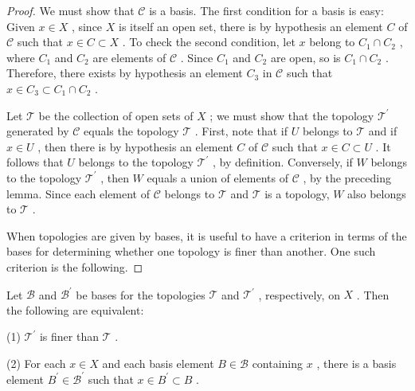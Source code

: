 \begin{proof}
We must show that \(\mathcal{C}\) is a basis. The first condition for a basis is easy: Given \(x \in  X\) , since \(X\) is itself an open set, there is by hypothesis an element \(C\) of \(\mathcal{C}\) such that \(x \in  C \subset  X\) . To check the second condition, let \(x\) belong to \({C}_{1} \cap  {C}_{2}\) , where \({C}_{1}\) and \({C}_{2}\) are elements of \(\mathcal{C}\) . Since \({C}_{1}\) and \({C}_{2}\) are open, so is \({C}_{1} \cap  {C}_{2}\) . Therefore, there exists by hypothesis an element \({C}_{3}\) in \(\mathcal{C}\) such that \(x \in  {C}_{3} \subset  {C}_{1} \cap  {C}_{2}\) .

Let \(\mathcal{T}\) be the collection of open sets of \(X\) ; we must show that the topology \({\mathcal{T}}^{\prime }\) generated by \(\mathcal{C}\) equals the topology \(\mathcal{T}\) . First, note that if \(U\) belongs to \(\mathcal{T}\) and if \(x \in  U\) , then there is by hypothesis an element \(C\) of \(\mathcal{C}\) such that \(x \in  C \subset  U\) . It follows that \(U\) belongs to the topology \({\mathcal{T}}^{\prime }\) , by definition. Conversely, if \(W\) belongs to the topology \({\mathcal{T}}^{\prime }\) , then \(W\) equals a union of elements of \(\mathcal{C}\) , by the preceding lemma. Since each element of \(\mathcal{C}\) belongs to \(\mathcal{T}\) and \(\mathcal{T}\) is a topology, \(W\) also belongs to \(\mathcal{T}\) .

When topologies are given by bases, it is useful to have a criterion in terms of the bases for determining whether one topology is finer than another. One such criterion is the following.
\end{proof}

\begin{lemma} Let \(\mathcal{B}\) and \({\mathcal{B}}^{\prime }\) be bases for the topologies \(\mathcal{T}\) and \({\mathcal{T}}^{\prime }\) , respectively, on \(X\) . Then the following are equivalent:

(1) \({\mathcal{T}}^{\prime }\) is finer than \(\mathcal{T}\) .

(2) For each \(x \in  X\) and each basis element \(B \in  \mathcal{B}\) containing \(x\) , there is a basis element \({B}^{\prime } \in  {\mathcal{B}}^{\prime }\) such that \(x \in  {B}^{\prime } \subset  B\) .
\end{lemma}

